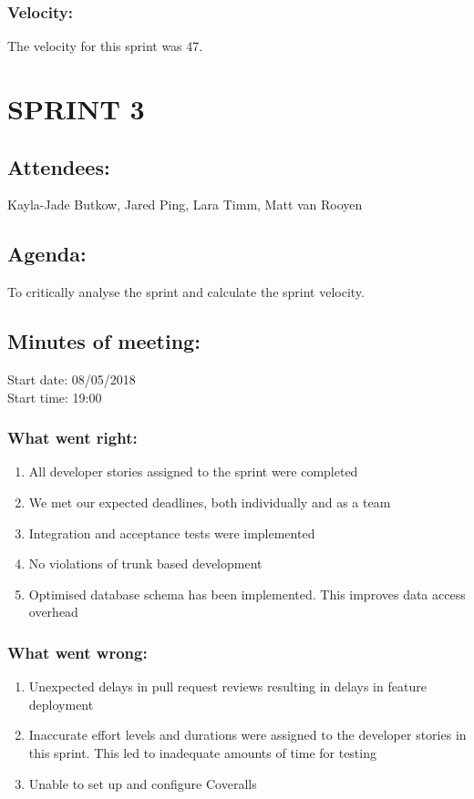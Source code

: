 \documentclass[10pt,onecolumn]{witseiepaper}
\begin{document}
\subsubsection*{Velocity:}
The velocity for this sprint was 47. 

\newpage
\section*{SPRINT 3}

\subsection*{Attendees:}
Kayla-Jade Butkow, Jared Ping, Lara Timm, Matt van Rooyen

\subsection*{Agenda:} 
To critically analyse the sprint and calculate the sprint velocity.

\subsection*{Minutes of meeting:}
Start date: 08/05/2018 \\
Start time: 19:00

\subsubsection*{What went right:}
\begin{enumerate}
	\item All developer stories assigned to the sprint were completed
	\item We met our expected deadlines, both individually and as a team
	\item Integration and acceptance tests were implemented
	\item No violations of trunk based development 
	\item Optimised database schema has been implemented. This improves data access overhead
	
\end{enumerate}

\subsubsection*{What went wrong:}
\begin{enumerate}
	\item Unexpected delays in pull request reviews resulting in delays in feature deployment
	\item Inaccurate effort levels and durations were assigned to the developer stories in this sprint. This led to inadequate amounts of time for testing 
	\item Unable to set up and configure Coveralls
\end{enumerate}
\end{document}
